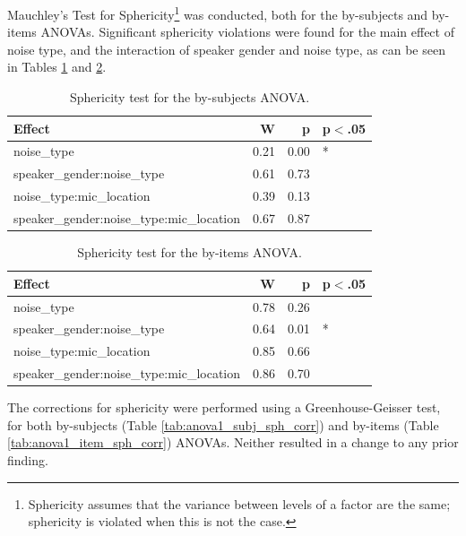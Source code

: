 \documentclass[dissertation,copyright]{uathesis}
\begin{document}
Mauchley's Test for Sphericity\footnote{Sphericity assumes that the variance between levels of a factor are the same; sphericity is violated when this is not the case.} was conducted, both for the by-subjects and by-items ANOVAs.  Significant sphericity violations were found for the main effect of noise type, and the interaction of speaker gender and noise type, as can be seen in Tables \ref{tab:anova1_subj_sph_test} and \ref{tab:anova1_item_sph_test}. 

\begin{table}[ht]
\centering
\begin{tabular}{lrrl}
  \hline
Effect & W & p & p$<$.05 \\ 
  \hline
noise\_type & 0.21 & 0.00 & * \\ 
  speaker\_gender:noise\_type & 0.61 & 0.73 &  \\ 
  noise\_type:mic\_location & 0.39 & 0.13 &  \\ 
  speaker\_gender:noise\_type:mic\_location & 0.67 & 0.87 &  \\ 
   \hline
\end{tabular}
\caption{Sphericity test for the by-subjects ANOVA.} 
\label{tab:anova1_subj_sph_test}
\end{table}
\begin{table}[ht]
\centering
\begin{tabular}{lrrl}
  \hline
Effect & W & p & p$<$.05 \\ 
  \hline
noise\_type & 0.78 & 0.26 &  \\ 
  speaker\_gender:noise\_type & 0.64 & 0.01 & * \\ 
  noise\_type:mic\_location & 0.85 & 0.66 &  \\ 
  speaker\_gender:noise\_type:mic\_location & 0.86 & 0.70 &  \\ 
   \hline
\end{tabular}
\caption{Sphericity test for the by-items ANOVA.} 
\label{tab:anova1_item_sph_test}
\end{table}


The corrections for sphericity were performed using a Greenhouse-Geisser test, for both by-subjects (Table \ref{tab:anova1_subj_sph_corr}) and by-items (Table \ref{tab:anova1_item_sph_corr}) ANOVAs.  Neither resulted in a change to any prior finding.
\end{document}
